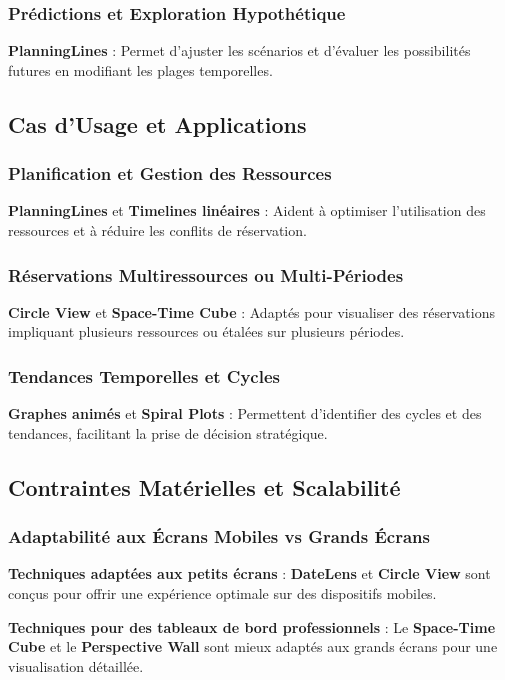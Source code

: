 \documentclass[runningheads]{llncs}
\begin{document}
\subsubsection{Prédictions et Exploration Hypothétique}
\textbf{PlanningLines} : Permet d'ajuster les scénarios et d'évaluer les possibilités futures en modifiant les plages temporelles.

\subsection{Cas d’Usage et Applications}

\subsubsection{Planification et Gestion des Ressources}
\textbf{PlanningLines} et \textbf{Timelines linéaires} : Aident à optimiser l'utilisation des ressources et à réduire les conflits de réservation.

\subsubsection{Réservations Multiressources ou Multi-Périodes}
\textbf{Circle View} et \textbf{Space-Time Cube} : Adaptés pour visualiser des réservations impliquant plusieurs ressources ou étalées sur plusieurs périodes.

\subsubsection{Tendances Temporelles et Cycles}
\textbf{Graphes animés} et \textbf{Spiral Plots} : Permettent d'identifier des cycles et des tendances, facilitant la prise de décision stratégique.

\subsection{Contraintes Matérielles et Scalabilité}

\subsubsection{Adaptabilité aux Écrans Mobiles vs Grands Écrans}
\textbf{Techniques adaptées aux petits écrans} : \textbf{DateLens} et \textbf{Circle View} sont conçus pour offrir une expérience optimale sur des dispositifs mobiles.

\textbf{Techniques pour des tableaux de bord professionnels} : Le \textbf{Space-Time Cube} et le \textbf{Perspective Wall} sont mieux adaptés aux grands écrans pour une visualisation détaillée.
\end{document}
